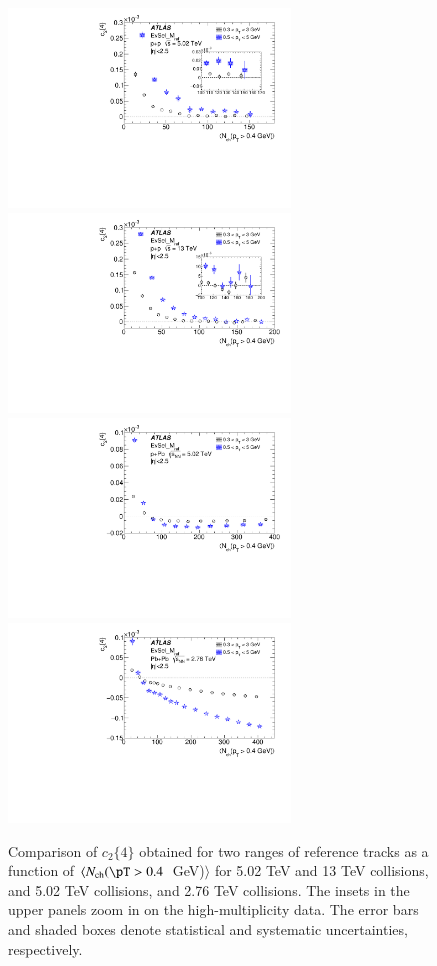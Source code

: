 \documentclass[cernpreprint,texlive=2014,txfonts,UKenglish]{latex/atlasdoc}
\begin{document}
\begin{figure}[H]
\begin{center}
\includegraphics[width=75mm]{fig_07a.pdf}
\includegraphics[width=75mm]{fig_07b.pdf}
\includegraphics[width=75mm]{fig_07c.pdf}
\includegraphics[width=75mm]{fig_07d.pdf}
\caption{Comparison of $c_2\{4\}$ obtained for two \pT ranges of reference tracks as a function of $\langle N_{\mathrm{ch}}(\pT > 0.4$~GeV)$\rangle$  for 5.02 TeV and 13 TeV \pp collisions, and  5.02 TeV \pPb collisions, and 2.76 TeV \PbPb collisions. The insets in the upper panels zoom in on the high-multiplicity data. The error bars and shaded boxes denote statistical and systematic uncertainties, respectively.}
\label{fig:compSystNtrkRef} 
\end{center}
\end{figure} 
\end{document}
